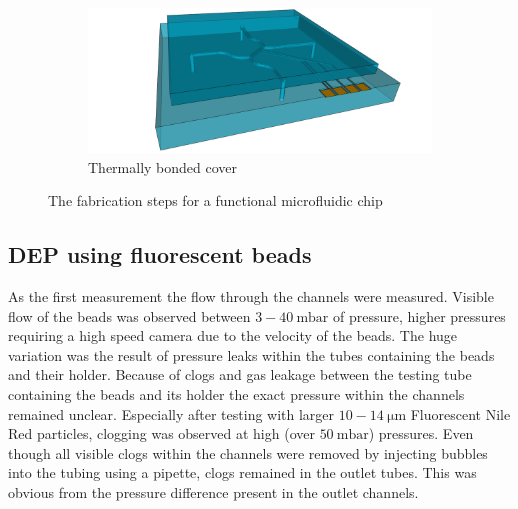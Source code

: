 \documentclass[final]{jyflluk}
\begin{document}
\begin{figure}\ContinuedFloat
    \centering    
    \vspace{1cm}
    \begin{subfigure}{\textwidth}
    \centering
        \includegraphics[width=\linewidth]{steps/11.Finished.png} 
        \caption{Thermally bonded cover} \label{fig:process11}
    \end{subfigure}
    \caption{The fabrication steps for a functional microfluidic chip} \label{fig:processFULL}
\end{figure}


\newpage
\newpage

\subsection{DEP using fluorescent beads}

As the first measurement the flow through the channels were measured. Visible flow of the beads was observed between  $3-\SI{40}{\milli \bar}$ of pressure, higher pressures requiring a high speed camera due to the velocity of the beads. The huge variation was the result of pressure leaks within the tubes containing the beads and their holder. Because of clogs and gas leakage between the testing tube containing the beads and its holder the exact pressure within the channels remained unclear. Especially after testing with larger $10-\SI{14}{\micro \metre}$  Fluorescent Nile Red particles, clogging was observed at high (over $\SI{50}{\milli \bar}$) pressures. Even though all visible clogs within the channels were removed by injecting bubbles into the tubing using a pipette, clogs remained in the outlet tubes. This was obvious from the pressure difference present in the outlet channels. 
\end{document}
